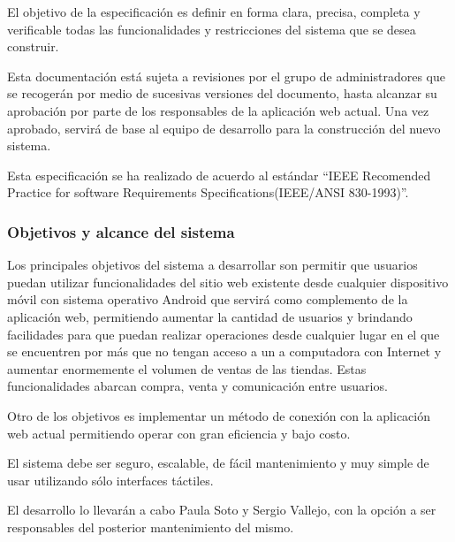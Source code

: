 El objetivo de la especificación es definir en forma clara, precisa, completa y verificable todas las funcionalidades y restricciones del sistema que se desea construir.

Esta documentación está sujeta a revisiones por el grupo de administradores que se recogerán por medio de sucesivas versiones del documento, hasta alcanzar su aprobación por parte de los responsables de la aplicación web actual. Una vez aprobado, servirá de base al equipo de desarrollo para la construcción del nuevo sistema.

Esta especificación se ha realizado de acuerdo al estándar “IEEE Recomended Practice for software Requirements Specifications(IEEE/ANSI 830-1993)”.

 
    \subsubsection{Objetivos y alcance del sistema}

Los principales objetivos del sistema a desarrollar son permitir que usuarios puedan utilizar funcionalidades del sitio web existente desde cualquier dispositivo móvil con sistema operativo Android que servirá como complemento de la aplicación web, permitiendo aumentar la cantidad de usuarios y brindando facilidades para que puedan realizar operaciones desde cualquier lugar en el que se encuentren por más que no tengan acceso a un a computadora con Internet y aumentar enormemente el volumen de ventas de las tiendas. Estas funcionalidades abarcan compra, venta y comunicación entre usuarios.

Otro de los objetivos es implementar un método de conexión con la aplicación web actual permitiendo operar con gran eficiencia y bajo costo.

El sistema debe ser seguro, escalable, de fácil mantenimiento y muy simple de usar utilizando sólo interfaces táctiles.

El desarrollo lo llevarán a cabo Paula Soto y Sergio Vallejo, con la opción a ser responsables del posterior mantenimiento del mismo.

